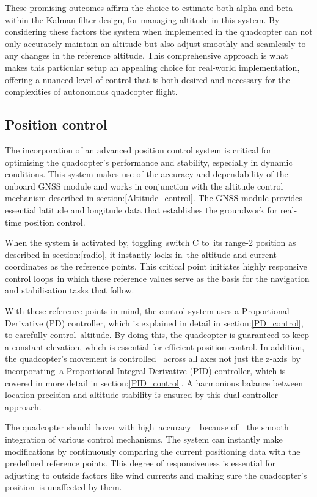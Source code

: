 \documentclass{article}
\begin{document}
These promising outcomes affirm the choice to estimate both alpha and beta within the Kalman filter design, for managing altitude in this system. By considering these factors the system when implemented in the quadcopter can not only accurately maintain an altitude but also adjust smoothly and seamlessly to any changes in the reference altitude. 
This comprehensive approach is what makes this particular setup an appealing choice for real-world implementation, offering a nuanced level of control that is both desired and necessary for the complexities of autonomous quadcopter flight.

\subsection{Position control}
The incorporation of an advanced position control system is critical for optimising the quadcopter's performance and stability, especially in dynamic conditions. This system makes use of the accuracy and dependability of the onboard GNSS module and works in conjunction with the altitude control mechanism described in section:\ref{Altitude_control}. The GNSS module provides 
essential latitude and longitude data that establishes the groundwork for real-time position control.

When the system is activated by, toggling switch C to its range-2 position as described in section:\ref{radio}, it instantly locks in the altitude and current coordinates as the reference points. This critical point initiates highly responsive control loops in which these reference values serve as the basis for the navigation and stabilisation tasks that follow.

With these reference points in mind, the control system uses a Proportional-Derivative (PD) controller, which is explained in detail in section:\ref{PD_control}, to carefully control altitude. By doing this, the quadcopter is guaranteed to keep a constant elevation, which is essential for efficient position control. In addition, the quadcopter's movement is controlled  across
all axes not just the z-axis by incorporating a Proportional-Integral-Derivative (PID) controller, which is covered in more detail in section:\ref{PID_control}. A harmonious balance between location precision and altitude stability is ensured by this dual-controller approach. 

The quadcopter should hover with high accuracy  because of  the smooth integration of various control mechanisms. The system can instantly make modifications by continuously comparing the current positioning data with the predefined reference points. This degree of responsiveness is essential for adjusting to outside factors like wind currents and making sure the quadcopter's position is unaffected by them.
\end{document}
